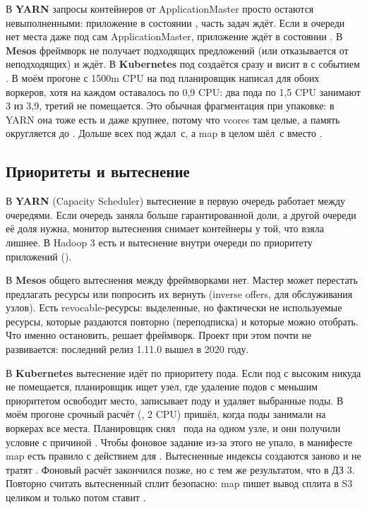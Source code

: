 В \textbf{YARN} запросы контейнеров от ApplicationMaster просто остаются невыполненными: приложение в состоянии , часть задач ждёт. Если в очереди нет места даже под сам ApplicationMaster, приложение ждёт в состоянии . В \textbf{Mesos} фреймворк не получает подходящих предложений (или отказывается от неподходящих) и ждёт. В \textbf{Kubernetes} под создаётся сразу и висит в  с событием . В моём прогоне с 1500m CPU на под планировщик написал  для обоих воркеров, хотя на каждом оставалось по 0,9 CPU: два пода по 1,5 CPU занимают 3 из 3,9, третий не помещается. Это обычная фрагментация при упаковке: в YARN она тоже есть и даже крупнее, потому что vcores там целые, а память округляется до . Дольше всех под ждал \cpuPendingMax\,с, а map в целом шёл \cpuMapSpan\,с вместо \parMapSpan.

\subsection{Приоритеты и вытеснение}

В \textbf{YARN} (Capacity Scheduler) вытеснение в первую очередь работает между очередями. Если очередь заняла больше гарантированной доли, а другой очереди её доля нужна, монитор вытеснения снимает контейнеры у той, что взяла лишнее. В Hadoop 3 есть и вытеснение внутри очереди по приоритету приложений ().

В \textbf{Mesos} общего вытеснения между фреймворками нет. Мастер может перестать предлагать ресурсы или попросить их вернуть (inverse offers, для обслуживания узлов). Есть revocable-ресурсы: выделенные, но фактически не используемые ресурсы, которые раздаются повторно (переподписка) и которые можно отобрать. Что именно остановить, решает фреймворк. Проект при этом почти не развивается: последний релиз 1.11.0 вышел в 2020 году.

В \textbf{Kubernetes} вытеснение идёт по приоритету пода. Если под с высоким  никуда не помещается, планировщик ищет узел, где удаление подов с меньшим приоритетом освободит место, записывает поду  и удаляет выбранные поды. В моём прогоне срочный расчёт (, 2 CPU) пришёл, когда поды  занимали на воркерах все места. Планировщик снял \preemptedCount\ пода на одном узле, и они получили условие  с причиной . Чтобы фоновое задание из-за этого не упало, в манифесте map есть правило  с действием  для . Вытесненные индексы создаются заново и не тратят . Фоновый расчёт закончился позже, но с тем же результатом, что в ДЗ 3. Повторно считать вытесненный сплит безопасно: map пишет вывод сплита в S3 целиком и только потом ставит .

